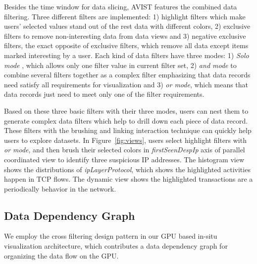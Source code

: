 \documentclass[journal]{vgtc}                %
\begin{document}
{Besides the time window for data slicing, AVIST features the combined data filtering. Three different filters are implemented: 1) highlight filters which make users' selected values stand out of the rest data with different colors,  2) exclusive filters to remove non-interesting data from data views and 3) negative exclusive filters, the exact opposite of exclusive filters, which remove all data except items marked interesting by a user. Each kind of data filters have three  modes: 1) \emph{Solo mode} , which allows only one filter value in current filter set, 2) \emph{and mode}  to combine several filters together as a complex filter emphasizing that data records need satisfy all requirements for visualization and 3) \emph{or mode}, which means that data records just need to meet only one of the filter requirements. 



Based on these three basic filters with their three modes, users can nest them to generate complex data filters which help to drill down each piece of data record. These filters with the brushing and linking interaction technique can quickly help users to explore datasets. In Figure~\ref{fig:views}, users select  highlight filters with \emph{or mode}, and then brush their selected colors in \textit{firstSeenDespIp} axis of parallel coordinated view to identify three suspicious IP addresses. The histogram view shows the distributions of \textit{ipLayerProtocol}, which shows the highlighted activities happen in TCP flows. The dynamic view shows the highlighted transactions are a  periodically behavior in the network.



\subsection{Data Dependency Graph}

We employ the cross filtering design pattern \cite{weaver2010cross} in our GPU based in-situ visualization architecture, which contributes  a data dependency graph for organizing the data flow on the GPU.

}
\end{document}
